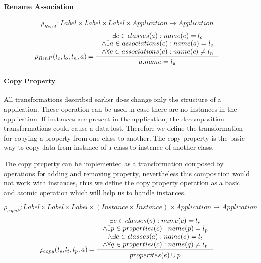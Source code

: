 \documentclass[11pt]{article}
\begin{document}
\paragraph{Rename Association}
$$\rho_{RenA} : Label \times Label \times Label \times Application \rightarrow Application $$
\begin{equation*}
	\rho_{RenP}(l_c, l_o, l_n, a) = \inference{\exists c \in classes(a) : name(c) = l_c \\ \wedge \exists a \in associations(c) : name(a) = l_o \\ \wedge \forall e \in associations(c) : name(e) \neq l_n}{\begin{gathered}
a.name = l_n 
\end{gathered}
}
\end{equation*}



\paragraph{Copy Property}
All transformations described earlier does change only the structure of a application. These operation can be used in case there are no instances in the application. If instances are present in the application, the decomposition transformations could cause a data lost. Therefore we define  the transformation for copying a property from one class to another. The copy property is the basic way to copy data from instance of a class to instance of another class.

The copy property can be implemented as a transformation composed by operations for adding and removing property, nevertheless this composition would not work with instances, thus we define the copy property operation as a basic and atomic operation which will help us to handle instances.

$$\rho_{copyP} : Label \times Label \times Label \times (Instance \times Instance) \times Application \rightarrow Application $$
\begin{equation*}
	\rho_{copy}(l_s, l_t, l_p, a) = \inference{\exists c \in classes(a) : name(c) = l_s \\ \wedge \exists p \in properties(c) : name(p) = l_p \\ \wedge \exists e \in classes(a) : name(e) = l_t  \\ \wedge \forall q \in properties(c) : name(q) \neq l_p}{\begin{gathered}
properites(e) \cup p 
\end{gathered}
}
\end{equation*}
\end{document}
